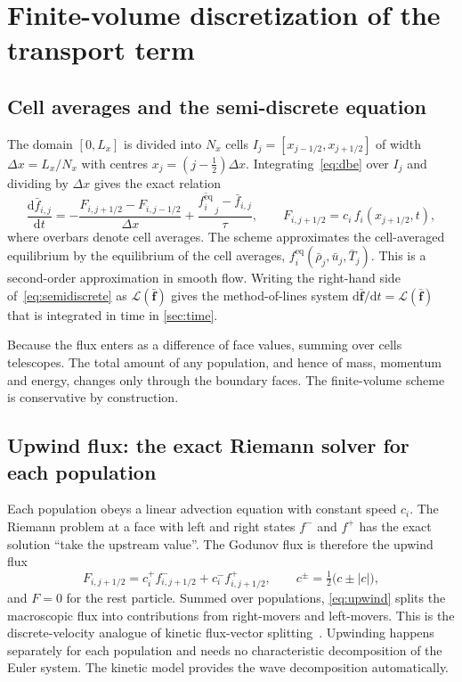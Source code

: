 \documentclass[11pt]{article}
\theoremstyle{remark}
\newcommand{\feq}{f^{\mathrm{eq}}}
\newcommand{\dd}{\mathrm{d}}
\begin{document}
\section{Finite-volume discretization of the transport term}
\label{sec:fv}

\subsection{Cell averages and the semi-discrete equation}
The domain $[0,L_x]$ is divided into $N_x$ cells
$I_j = [x_{j-1/2},x_{j+1/2}]$ of width $\Delta x = L_x/N_x$ with centres
$x_j = (j-\tfrac12)\Delta x$.  Integrating~\eqref{eq:dbe} over $I_j$ and dividing by
$\Delta x$ gives the exact relation
\begin{equation}
  \frac{\dd \bar f_{i,j}}{\dd t} = -\frac{F_{i,j+1/2} - F_{i,j-1/2}}{\Delta x}
     + \frac{\overline{\feq_i}_{\,j} - \bar f_{i,j}}{\tau},
  \qquad F_{i,j+1/2} = c_i\,f_i(x_{j+1/2},t),
  \label{eq:semidiscrete}
\end{equation}
where overbars denote cell averages.  The scheme approximates the cell-averaged
equilibrium by the equilibrium of the cell averages, $\feq_i(\bar\rho_j,\bar u_j,\bar T_j)$.
This is a second-order approximation in smooth flow.  Writing the right-hand side
of~\eqref{eq:semidiscrete} as $\mathcal L(\bar{\mathbf f})$ gives the
method-of-lines system $\dd\bar{\mathbf f}/\dd t = \mathcal L(\bar{\mathbf f})$
that is integrated in time in \cref{sec:time}.

Because the flux enters as a difference of face values, summing over cells
telescopes.  The total amount of any population, and hence of mass, momentum and
energy, changes only through the boundary faces.  The finite-volume scheme is
conservative by construction.

\subsection{Upwind flux: the exact Riemann solver for each population}
Each population obeys a linear advection equation with constant speed $c_i$.  The
Riemann problem at a face with left and right states $f^-$ and $f^+$ has the exact
solution ``take the upstream value''.  The Godunov flux is therefore the upwind flux
\begin{equation}
  F_{i,j+1/2} = c_i^+ f^-_{i,j+1/2} + c_i^- f^+_{i,j+1/2},\qquad
  c^\pm = \tfrac12\bigl(c\pm|c|\bigr),
  \label{eq:upwind}
\end{equation}
and $F=0$ for the rest particle.  Summed over populations, \eqref{eq:upwind}
splits the macroscopic flux into contributions from right-movers and left-movers.
This is the discrete-velocity analogue of kinetic flux-vector
splitting~\citep{MandalDeshpande1994}.  Upwinding happens separately for each
population and needs no characteristic decomposition of the Euler system.  The
kinetic model provides the wave decomposition automatically.
\end{document}
